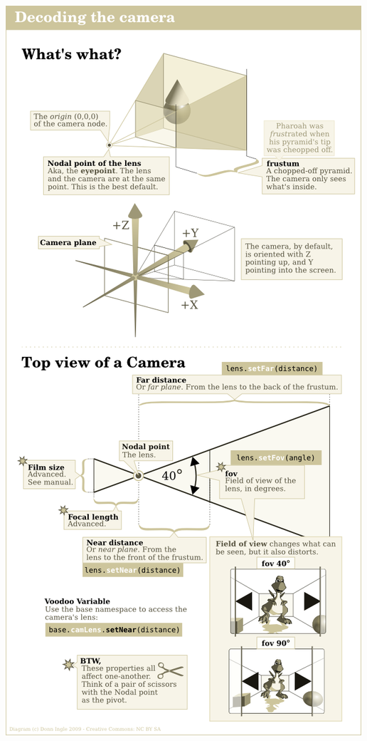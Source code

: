 \documentclass[a4paper,10pt]{book}
\begin{document}
\begin{center}
\includegraphics[scale=0.8]{Camera.png} 
\end{center}
\end{document}
